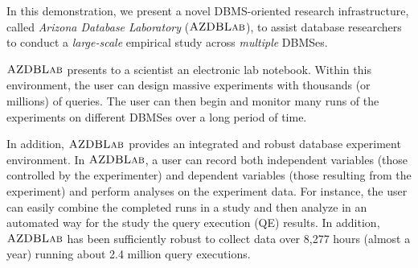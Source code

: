 \documentclass{vldb}
\def\azdb{\hbox{\sc AZDBLab}}
\begin{document}
In this demonstration, we present a novel DBMS-oriented \hbox{research} infrastructure, 
called {\em Arizona Database Laboratory} ($\azdb$), to assist database researchers 
to conduct a {\em large-scale} empirical study across {\em multiple} \hbox{DBMSes}. 

$\azdb$ presents to a scientist an electronic lab \linebreak \hbox{notebook}. 
Within this environment, the user can \hbox{design} massive \hbox{experiments} with \hbox{thousands} (or millions) of queries. 
The user can then begin and monitor many runs of the \hbox{experiments}  
on different \hbox{DBMSes} over a long period of time. 

In addition, $\azdb$ provides an integrated and robust database experiment environment. 
In $\azdb$, a user can record both independent variables (those controlled by the \hbox{experimenter}) 
and dependent variables (those \hbox{resulting} from the \hbox{experiment}) and perform analyses on the \linebreak \hbox{experiment} data. 
For instance, the user can easily \hbox{combine} the \hbox{completed} runs in a study and then analyze in an \linebreak \hbox{automated} way for the study the query execution (QE) \linebreak \hbox{results}. 
In addition, \hbox{$\azdb$} has been sufficiently \hbox{robust} to collect data over 8,277 hours (\hbox{almost} a year) 
running about 2.4 million query executions. 

\end{document}
